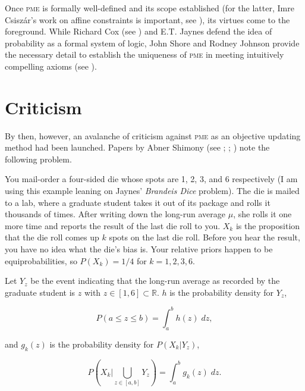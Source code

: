 \documentclass[phd,12pt,oneside]{ubcthesis}
\begin{document}
Once \textsc{pme} is formally well-defined and its scope
established (for the latter, Imre Csisz{\'a}r's work on affine
constraints is important, see ), its virtues
come to the foreground. While Richard Cox (see ) and
E.T. Jaynes defend the idea of probability as a formal system of
logic, John Shore and Rodney Johnson provide the necessary detail to
establish the uniqueness of \textsc{pme} in meeting intuitively
compelling axioms (see ).

\section{Criticism}
\label{sec:iejikoov}

By then, however, an avalanche of criticism against \textsc{pme} as an
objective updating method had been launched. Papers by Abner Shimony
(see ; ;
) note the following problem. 

\begin{quotex}
  \label{ex:phooxaik} You
  mail-order a four-sided die whose spots are 1, 2, 3, and 6
  respectively (I am using this example leaning on Jaynes'
  \emph{Brandeis Dice} problem). The die is mailed to a lab, where a
  graduate student takes it out of its package and rolls it thousands
  of times. After writing down the long-run average $\mu$, she rolls
  it one more time and reports the result of the last die roll to you.
  $X_{k}$ is the proposition that the die roll comes up $k$ spots on
  the last die roll. Before you hear the result, you have no idea what
  the die's bias is. Your relative priors happen to be
  equiprobabilities, so $P(X_{k})=1/4$ for $k=1,2,3,6$.
\end{quotex}

{\noindent}Let $Y_{z}$ be the event indicating that the long-run
average as recorded by the graduate student is $z$ with
$z\in[1,6]\subset\mathbb{R}$. $h$ is the probability density for
$Y_{z}$,

\begin{equation}
  \label{eq:eophieko}
  P(a\leq{}z\leq{}b)=\int_{a}^{b}h(z)\;{}dz,
\end{equation}

{\noindent}and $g_{k}(z)$ is the probability density for $P(X_{k}|Y_{z})$,

\begin{equation}
  \label{eq:ualoomai}
  P\left(X_{k}|\bigcup_{z\in[a,b]}Y_{z}\right)=\int_{a}^{b}g_{k}(z)\;{}dz.
\end{equation}
\end{document}
